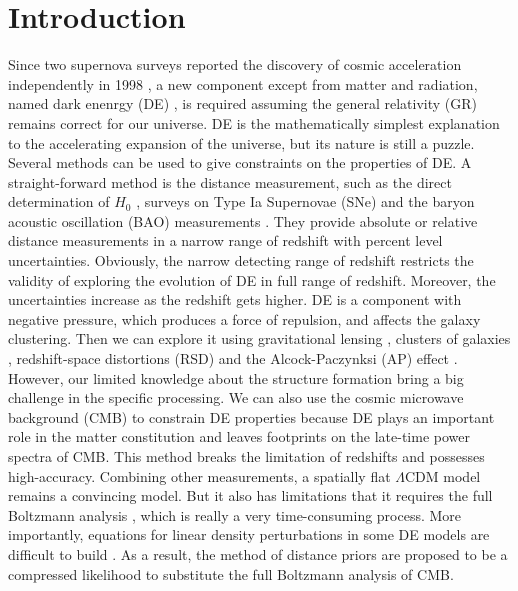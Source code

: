 \documentclass[floatfix,aps,amsmath,nofootinbib,onecolumn,10pt]{revtex4}
\begin{document}
 
 

\section{Introduction}
\label{introduction}

Since two supernova surveys reported the discovery of cosmic acceleration independently in 1998 \cite{Riess:1998cb,Perlmutter:1998np}, a new component except from matter and radiation, named dark enenrgy (DE) \cite{Peebles:2002gy}, is required assuming the general relativity (GR) remains correct for our universe. 
DE is the mathematically simplest explanation to the accelerating expansion of the universe, but its nature is still a puzzle. 
Several methods can be used to give constraints on the properties of DE. 
A straight-forward method is the distance measurement, such as the direct determination of $H_0$ \cite{Riess:2016jrr}, surveys on Type Ia Supernovae (SNe) \cite{Conley:2011ku,Suzuki:2011hu} and the baryon acoustic oscillation (BAO) measurements \cite{Cole:2005sx}. They provide absolute or relative distance measurements in a narrow range of redshift with percent level uncertainties. Obviously, the narrow detecting range of redshift restricts the validity of exploring the evolution of DE in full range of redshift. Moreover, the uncertainties increase as the redshift gets higher. 
DE is a component with negative pressure, which produces a force of repulsion, and affects the galaxy clustering. Then we can explore it using gravitational lensing \cite{Sanchez:2006nj}, clusters of galaxies \cite{Neveu:2017jkg}, redshift-space distortions (RSD) \cite{Gil-Marin:2015sqa} and the Alcock-Paczynksi (AP) effect \cite{Alcock:1979mp}. However, our limited knowledge about the structure formation bring a big challenge in the specific processing. 
We can also use the cosmic microwave background (CMB) \cite{Komatsu:2008hk,Aghanim:2018eyx} to constrain DE properties because DE plays an important role in the matter constitution and leaves footprints on the late-time power spectra of CMB. This method breaks the limitation of redshifts and possesses high-accuracy. Combining other measurements, a spatially flat $\Lambda$CDM model remains a convincing model. But it also has limitations that it requires the full Boltzmann analysis \cite{Bean:2003fb,Weller:2003hw,Li:2008cj}, which is really a very time-consuming process. More importantly, equations for linear density perturbations in some DE models are difficult to build \cite{Dvali:2000xg,Koyama:2006ef}. As a result, the method of distance priors \cite{Bond:1997wr,Efstathiou:1998xx,Wang:2007mza} are proposed to be a compressed likelihood to substitute the full Boltzmann analysis of CMB. 
 
\end{document}
